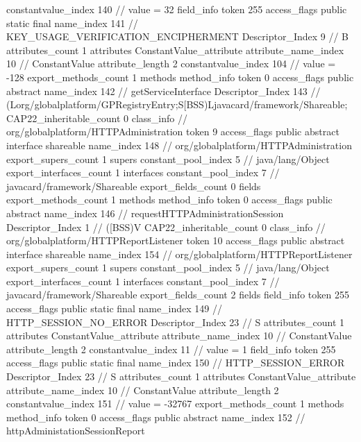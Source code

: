 {{{{{{{					constantvalue_index	140		// value = 32
				}
				}
			}
			field_info {
				token	255
				access_flags	public static final
				name_index	141		// KEY_USAGE_VERIFICATION_ENCIPHERMENT
				Descriptor_Index	9		// B
				attributes_count	1
				attributes {
				ConstantValue_attribute {
					attribute_name_index	10		// ConstantValue
					attribute_length	2
					constantvalue_index	104		// value = -128
				}
				}
			}
			}
			export_methods_count	1
			methods {
				method_info {
					token	0
					access_flags	public abstract
					name_index	142		// getServiceInterface
					Descriptor_Index	143		// (Lorg/globalplatform/GPRegistryEntry;S[BSS)Ljavacard/framework/Shareable;
				}
			}
			CAP22_inheritable_count	0
		}
		class_info {		// org/globalplatform/HTTPAdministration
			token	9
			access_flags	public abstract interface shareable
			name_index	148		// org/globalplatform/HTTPAdministration
			export_supers_count	1
			supers {
				constant_pool_index	5		// java/lang/Object
			}
			export_interfaces_count	1
			interfaces {
				constant_pool_index	7		// javacard/framework/Shareable
			}
			export_fields_count	0
			fields {
			}
			export_methods_count	1
			methods {
				method_info {
					token	0
					access_flags	public abstract
					name_index	146		// requestHTTPAdministrationSession
					Descriptor_Index	1		// ([BSS)V
				}
			}
			CAP22_inheritable_count	0
		}
		class_info {		// org/globalplatform/HTTPReportListener
			token	10
			access_flags	public abstract interface shareable
			name_index	154		// org/globalplatform/HTTPReportListener
			export_supers_count	1
			supers {
				constant_pool_index	5		// java/lang/Object
			}
			export_interfaces_count	1
			interfaces {
				constant_pool_index	7		// javacard/framework/Shareable
			}
			export_fields_count	2
			fields {
			field_info {
				token	255
				access_flags	public static final
				name_index	149		// HTTP_SESSION_NO_ERROR
				Descriptor_Index	23		// S
				attributes_count	1
				attributes {
				ConstantValue_attribute {
					attribute_name_index	10		// ConstantValue
					attribute_length	2
					constantvalue_index	11		// value = 1
				}
				}
			}
			field_info {
				token	255
				access_flags	public static final
				name_index	150		// HTTP_SESSION_ERROR
				Descriptor_Index	23		// S
				attributes_count	1
				attributes {
				ConstantValue_attribute {
					attribute_name_index	10		// ConstantValue
					attribute_length	2
					constantvalue_index	151		// value = -32767
				}
				}
			}
			}
			export_methods_count	1
			methods {
				method_info {
					token	0
					access_flags	public abstract
					name_index	152		// httpAdministationSessionReport
}}}}}
